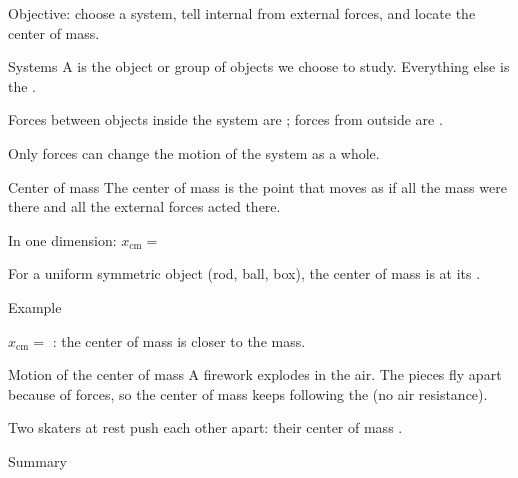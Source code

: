 \begin{center}\textsf{\small\color{apgrey}Objective: choose a system, tell internal from external forces, and locate the center of mass.}\end{center}
\begin{nrow}{Systems}
A  is the object or group of objects we choose to study. Everything else is the .\par
Forces between objects inside the system are ; forces from outside are .\par
Only  forces can change the motion of the system as a whole.
\end{nrow}
\begin{nrow}{Center of mass}
The center of mass is the point that moves as if all the mass were there and all the external forces acted there.\par\smallskip
In one dimension: $x_\text{cm}=$ \par\smallskip
For a uniform symmetric object (rod, ball, box), the center of mass is at its .
\end{nrow}
\begin{nrow}{Example}
\begin{center}\end{center}
$x_\text{cm}=$ : the center of mass is closer to the  mass.
\end{nrow}
\begin{nrow}{Motion of the center of mass}
A firework explodes in the air. The pieces fly apart because of  forces, so the center of mass keeps following the  (no air resistance).\par
Two skaters at rest push each other apart: their center of mass .
\end{nrow}
\begin{nrow}{Summary}
\else\vspace{2.2cm}\fi
\end{nrow}


